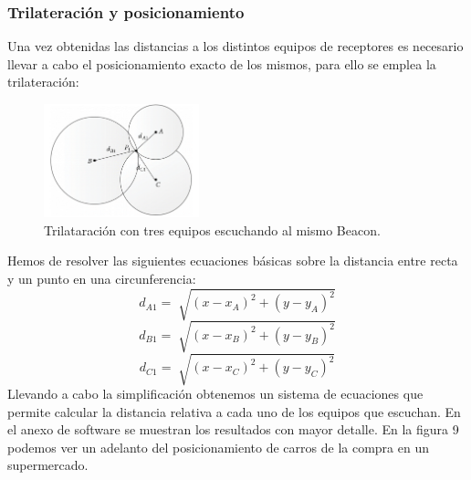 \documentclass[paper=a4, fontsize=11pt,twoside]{scrartcl}	%
\begin{document}
        \subsubsection{Trilateración y posicionamiento}
            Una vez obtenidas las distancias a los distintos equipos de receptores es necesario llevar a cabo el
            posicionamiento exacto de los mismos, para ello se emplea la trilateración:
            \begin{center}
                \begin{figure}[h]
                    \centering
                    \includegraphics[width=0.4\textwidth]{trilateration_circle.png}
                    \caption{Trilataración con tres equipos escuchando al mismo Beacon.}
                    \label{fig:mesh7}
                \end{figure}
            \end{center}
                Hemos de resolver las siguientes ecuaciones básicas sobre la distancia entre recta y un punto en 
                una circunferencia:
                \begin{equation}
                    d_{A1}= \sqrt[]{(x-x_A)^2+(y-y_A)^2}
                \end{equation}
                \begin{equation}
                d_{B1}= \sqrt[]{(x-x_B)^2+(y-y_B)^2}
                \end{equation}
                \begin{equation}
                    d_{C1}= \sqrt[]{(x-x_C)^2+(y-y_C)^2}
                \end{equation}
                Llevando a cabo la simplificación obtenemos un sistema de ecuaciones que permite calcular la distancia
                relativa a cada uno de los equipos que escuchan. En el anexo de software se muestran los resultados con mayor 
                detalle. En la figura 9 podemos ver un adelanto del posicionamiento de carros de la compra en un supermercado.
\end{document}

